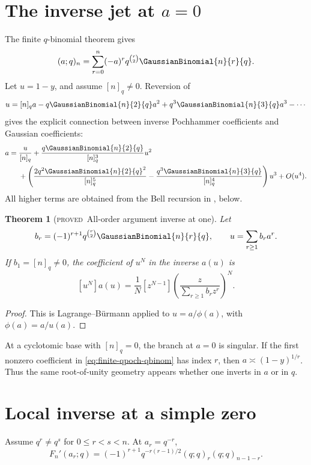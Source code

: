 \documentclass[11pt,letterpaper,oneside,openany]{book}
\newtheorem{theorem}{Theorem}[chapter]
\theoremstyle{definition}
\theoremstyle{remark}
\newcommand{\statusproved}{\textcolor{provedgreen}{\textsc{proved}}}
\begin{document}
\section{The inverse jet at \texorpdfstring{\(a=0\)}{a=0}}
The finite \(q\)-binomial theorem gives
\begin{equation}\label{eq:finite-qpoch-qbinom}
 (a;q)_n=\sum_{r=0}^{n}(-a)^rq^{\binom r2}\GaussianBinomial{n}{r}{q}.
\end{equation}
Let \(u=1-y\), and assume \([n]_q\ne0\).  Reversion of
\[
 u=[n]_qa-q\GaussianBinomial{n}{2}{q}a^2+q^3\GaussianBinomial{n}{3}{q}a^3-\cdots
\]
gives the explicit connection between inverse Pochhammer coefficients and
Gaussian coefficients:
\begin{align}
 a={}&\frac{u}{[n]_q}
 +\frac{q\GaussianBinomial{n}{2}{q}}{[n]_q^3}u^2 \notag\\
 &+\left(
 \frac{2q^2\GaussianBinomial{n}{2}{q}^2}{[n]_q^5}
 -\frac{q^3\GaussianBinomial{n}{3}{q}}{[n]_q^4}
 \right)u^3+O(u^4).
 \label{eq:argument-inverse-at-zero}
\end{align}
All higher terms are obtained from the Bell recursion in
, below.

\begin{theorem}[\statusproved\ All-order argument inverse at one]
\label{thm:argument-all-order}
Let
\[
 b_r=(-1)^{r+1}q^{\binom r2}\GaussianBinomial{n}{r}{q},
 \qquad
 u=\sum_{r\ge1}b_ra^r.
\]
If \(b_1=[n]_q\ne0\), the coefficient of \(u^N\) in the inverse \(a(u)\) is
\[
 [u^N]a(u)=\frac1N[z^{N-1}]
 \left(\frac{z}{\sum_{r\ge1}b_rz^r}\right)^N.
\]
\end{theorem}
\begin{proof}
This is Lagrange--Bürmann applied to \(u=a/\phi(a)\), with
\(\phi(a)=a/u(a)\).
\end{proof}

At a cyclotomic base with \([n]_q=0\), the branch at \(a=0\) is singular.  If
the first nonzero coefficient in \eqref{eq:finite-qpoch-qbinom} has index
\(r\), then \(a\asymp(1-y)^{1/r}\).  Thus the same root-of-unity geometry
appears whether one inverts in \(a\) or in \(q\).

\section{Local inverse at a simple zero}
Assume \(q^r\ne q^s\) for \(0\le r<s<n\).  At \(a_r=q^{-r}\),
\begin{equation}\label{eq:simple-zero-derivative}
 F_n'(a_r;q)=(-1)^{r+1}q^{-r(r-1)/2}(q;q)_r(q;q)_{n-1-r}.
\end{equation}
\end{document}
